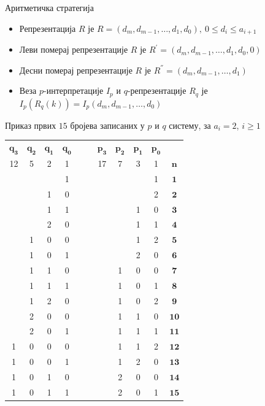 \documentclass[10pt]{beamer}
\begin{document}
	\begin{frame}{Аритметичка стратегија}
		\begin{itemize}
			\item Репрезентација $ R $ је $ R = (d_{m}, d_{m-1}, \ldots , d_{1}, d_{0}), \ 0 \leq d_{i} \leq a_{i+1} $
			\item Леви померај репрезентације $ R $ је $ R^{'} = (d_{m}, d_{m-1}, \ldots , d_{1}, d_{0}, 0) $
			\item Десни померај репрезентације $ R $ је $ R^{''} = (d_{m}, d_{m-1}, \ldots , d_{1}) $
			\item Веза $ p $-интерпретације $ I_{p} $ и $ q $-репрезентације $ R_{q} $ је $ I_{p}(R_{q}(k)) = I_{p}(d_{m}, d_{m-1}, \ldots, d_{0}) $
		\end{itemize}
	\end{frame}
	
	\begin{frame}{Приказ првих $ 15 $ бројева записаних у $ p $ и $ q $ систему, за $ a_{i} = 2 $, $ i \geq 1 $}
		\begin{table}[h!]
			\begin{center}
				\begin{tabular}{ | c | c | c | c | c  c | c | c | c | c | c |}
					\hline
					{$ \mathbf{q_{3}} $} &  {$ \mathbf{q_{2}} $} &  {$ \mathbf{q_{1}} $} &  {$ \mathbf{q_{0}} $} & & &  {$ \mathbf{p_{3}} $} &  {$ \mathbf{p_{2}} $} &  {$ \mathbf{p_{1}} $} &  {$ \mathbf{p_{0}} $} &\\
					12 & 5 & 2 & 1 & & & 17 & 7 & 3 & 1 &  {$ \mathbf{n} $}\\
					\hline
					&  &  & 1 & & &  &  &  & 1 & {$ \mathbf{1} $}\\
					&  & 1 & 0 & & &  &  &  & 2 & {$ \mathbf{2} $}\\
					&  & 1 & 1 & & &  &  & 1 & 0 &  {$ \mathbf{3} $}\\
					&  & 2 & 0 & & &  &  & 1 & 1 &  {$ \mathbf{4} $}\\
					& 1 & 0 & 0 & & &  &  & 1 & 2 &  {$ \mathbf{5} $}\\
					& 1 & 0 & 1 & & &  &  & 2 & 0 &  {$ \mathbf{6} $}\\
					& 1 & 1 & 0 & & &  & 1 & 0 & 0 &  {$ \mathbf{7} $}\\
					& 1 & 1 & 1 & & &  & 1 & 0 & 1 &  {$ \mathbf{8} $}\\
					& 1 & 2 & 0 & & &  & 1 & 0 & 2 &  {$ \mathbf{9} $}\\
					& 2 & 0 & 0 & & &  & 1 & 1 & 0 &  {$ \mathbf{10} $}\\
					& 2 & 0 & 1 & & &  & 1 & 1 & 1 &  {$ \mathbf{11} $}\\
					1 & 0 & 0 & 0 & & & & 1 & 1 & 2 &  {$ \mathbf{12} $}\\
					1 & 0 & 0 & 1 & & & & 1 & 2 & 0 &  {$ \mathbf{13} $}\\
					1 & 0 & 1 & 0 & & & & 2 & 0 & 0 &  {$ \mathbf{14} $}\\
					1 & 0 & 1 & 1 & & & & 2 & 0 & 1 &  {$ \mathbf{15} $}\\
					\hline 
				\end{tabular}
			\end{center}
		\end{table}
	\end{frame}
	
\end{document}
